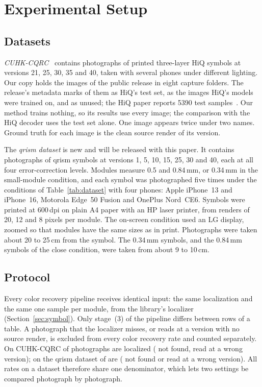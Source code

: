 \section{Experimental Setup}
\label{sec:setup}

\subsection{Datasets}

\emph{CUHK-CQRC}~\cite{yang2018hiq} contains photographs of printed three-layer HiQ symbols
at versions 21, 25, 30, 35 and 40, taken with several phones under different lighting. Our
copy holds the \HiqAttempted{} images of the public release in eight capture folders. The
release's metadata marks \SplitTest{} of them as HiQ's test set, \SplitTrain{} as the images
HiQ's models were trained on, and \SplitUnused{} as unused; the HiQ paper reports 5390 test
samples~\cite{yang2018hiq}. Our method trains nothing, so its results use every image; the
comparison with the HiQ decoder uses the test set alone. One image appears twice under two
names. Ground truth for each image is the clean source render of its version.

The \emph{qrism dataset} is new and will be released with this paper. It contains
\QrAttempted{} photographs of qrism symbols at versions 1, 5, 10, 15, 25, 30 and 40, each
at all four error-correction levels. Modules measure 0.5 and 0.84\,mm, or 0.34\,mm in the
small-module condition, and each symbol was photographed five times under the
conditions of Table~\ref{tab:dataset} with four phones: Apple iPhone~13 and iPhone~16,
Motorola Edge~50 Fusion and OnePlus Nord~CE6. Symbols were printed at 600\,dpi on plain A4 paper with an HP laser printer, from renders of
20, 12 and 8 pixels per module. The on-screen condition used an LG display, zoomed so that
modules have the same sizes as in print. Photographs were taken about 20 to 25\,cm from the symbol. The
0.34\,mm symbols, and the 0.84\,mm symbols of the close condition, were taken from about 9 to
10\,cm.



\subsection{Protocol}

Every color recovery pipeline receives identical input: the same localization and the
same one sample per module, from the library's localizer (Section~\ref{sec:symbol}). Only
stage~(3) of the pipeline differs between rows of a table. A photograph that the localizer
misses, or reads at a version with no source render, is excluded from every color
recovery rate and counted separately. On CUHK-CQRC \HiqLocalized{} of \HiqAttempted{}
photographs are localized (\HiqNoSymbol{} not found, \HiqMisread{} read at a wrong version);
on the qrism dataset \QrLocalized{} of \QrAttempted{} are (\QrNotLocalized{} not found or
read at a wrong version). All rates on a dataset therefore share one denominator, which
lets two settings be compared photograph by photograph.

